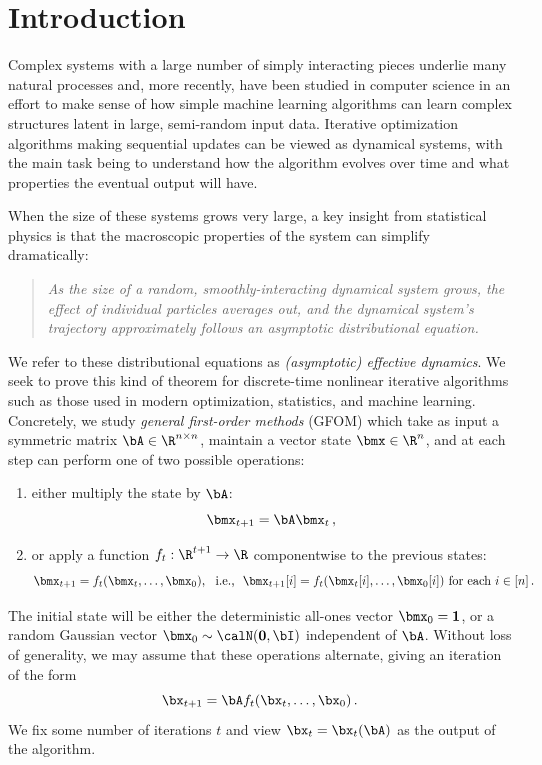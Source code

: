 \section{Introduction}
\label{sec:intro}

Complex systems with a large number of simply interacting pieces underlie many natural processes and, more recently,
have been studied in computer science in an effort to make sense of how simple machine learning algorithms can learn complex structures latent in large, semi-random input data.
Iterative optimization algorithms making sequential updates can be viewed as dynamical systems,
with the main task being to understand how the algorithm evolves over time and what properties the eventual output will have.

When the size of these systems grows very large, a key insight from statistical physics is that 
the macroscopic properties of the system can simplify dramatically:

\begin{quote}
    \textit{As the size of a random, smoothly-interacting dynamical system grows, the effect of individual particles averages out, and the dynamical system's trajectory approximately follows an asymptotic distributional equation.}
\end{quote}

We refer to these distributional equations as \emph{(asymptotic) effective
dynamics}.
We seek to prove this kind of theorem for discrete-time nonlinear iterative algorithms such as those used in modern optimization, statistics, and machine learning.
Concretely, we study \emph{general first-order methods} (GFOM) \cite{celentano2020estimation, montanari2022statistically} which take as input a symmetric matrix $\bA \in \R^{n \times n}$, maintain a vector state $\bmx \in \R^n$, and at each step can perform one of two possible operations:
\begin{enumerate}[1.]
    \item either multiply the state by $\bA$:
        \[ \bmx_{t+1} = \bA \bmx_t\,, \]
    \item or apply a function $f_t : \R^{t+1} \to \R$ componentwise to the previous states:
        \[ \bmx_{t+1} = f_t(\bmx_t, \dots, \bmx_0), \,\,\,\, \text{i.e.,} \,\,\,\, \bmx_{t + 1}[i] = f_t(\bmx_{t}[i], \dots, \bmx_{0}[i]) \text{ for each } i \in [n]\,. \]
\end{enumerate}
The initial state will be either the deterministic all-ones vector $\bmx_0 = \mathbf{1}$, or a random Gaussian vector $\bmx_0 \sim \calN(\mathbf{0}, \bI)$ independent of $\bA$.
Without loss of generality, we may assume that these operations alternate, giving an iteration of the form
\[ \bx_{t + 1} = \bA f_t(\bx_t, \dots, \bx_0)\,. \]
We fix some number of iterations $t$ and view $\bx_t = \bx_t(\bA)$ as the output of the algorithm.


